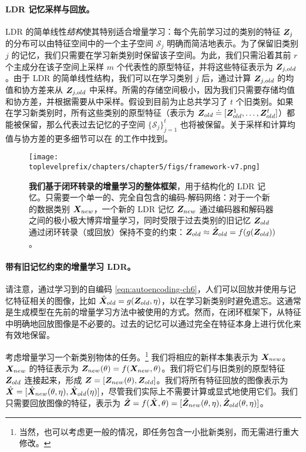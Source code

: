 \documentclass[../../book-main.tex]{subfiles}
\begin{document}
\paragraph{LDR 记忆采样与回放。} LDR 的简单线性{\em 结构}使其特别适合增量学习：每个先前学习过的类别的特征 $\bm{Z}_j$ 的分布可以由特征空间中的一个主子空间 $\mathcal{S}_j$ 明确而简洁地表示。为了保留旧类别 $j$ 的记忆，我们只需要在学习新类别时保留该子空间。为此，我们只需沿着其前 $r$ 个主成分在该子空间上采样 $m$ 个代表性的原型特征，并将这些特征表示为 $\bm{Z}_{j,old}$。由于 LDR 的简单线性结构，我们可以在学习类别 $j$ 后，通过计算 $\bm{Z}_{j,old}$ 的均值和协方差来从 $\bm{Z}_{j,old}$ 中采样。所需的存储空间极小，因为我们只需要存储均值和协方差，并根据需要从中采样。假设到目前为止总共学习了 $t$ 个旧类别。如果在学习新类别时，所有这些类别的原型特征（表示为 $\bm{Z}_{old} \doteq [\bm{Z}^1_{old},\ldots, \bm{Z}^t_{old}]$）都能被保留，那么代表过去记忆的子空间 $\{\mathcal{S}_j\}_{j=1}^t$ 也将被保留。关于采样和计算均值与协方差的更多细节可以在 \cite{tong2023incremental} 的工作中找到。

\begin{figure*}[t]
\centering
\texttt{[image: \\toplevelprefix/chapters/chapter5/figs/framework-v7.png]}
\caption{\textbf{我们基于闭环转录的增量学习的整体框架}，用于结构化的 LDR 记忆。只需要一个单一的、完全自包含的编码-解码网络：对于一个新的数据类别 $\bm{X}_{new}$，一个新的 LDR 记忆 $\bm{Z}_{new}$ 通过编码器和解码器之间的极小极大博弈增量学习，同时受限于过去类别的旧记忆 $\bm{Z}_{old}$ 通过闭环转录（或回放）保持不变的约束：$\bm{Z}_{old} \approx \hat{\bm{Z}}_{old} = f(g(\bm{Z}_{old}))$。
\vspace{-0.2in}}
\label{fig:framework}
\end{figure*}

\paragraph{带有旧记忆约束的增量学习 LDR。} 
请注意，通过学习到的自编码 \eqref{eqn:autoencoding-ch6}，人们可以回放并使用与记忆特征相关的图像，比如 $\hat{\bm{X}}_{old} = g(\bm{Z}_{old}, \eta)$，以在学习新类别时避免遗忘。这通常是生成模型在先前的增量学习方法中被使用的方式。然而，在闭环框架下，从特征中明确地回放图像是不必要的。过去的记忆可以通过完全在特征本身上进行优化来有效地保留。

考虑增量学习一个新类别物体的任务。\footnote{当然，也可以考虑更一般的情况，即任务包含一小批新类别，而无需进行重大修改。} 我们将相应的新样本集表示为 $\bm{X}_{new}$。$\bm{X}_{new}$ 的特征表示为 $\bm{Z}_{new}(\theta) = f(\bm{X}_{new}, \theta)$。我们将它们与旧类别的原型特征 $\bm{Z}_{old}$ 连接起来，形成 $\bm{Z} = [\bm{Z}_{new}(\theta), \bm{Z}_{old}]$。我们将所有特征回放的图像表示为 $\hat{\bm{X}} = [{\hat{\bm{X}}_{new}(\theta,\eta)}, {\hat{\bm{X}}_{old}(\eta)}]$，尽管我们实际上不需要计算或显式地使用它们。我们只需要回放图像的特征，表示为 $\hat{\bm{Z}} = f(\hat{\bm{X}}, \theta) =  [{\hat{\bm{Z}}_{new}(\theta,\eta)}, {\hat{\bm{Z}}_{old}(\theta,\eta)}]$。
\end{document}
